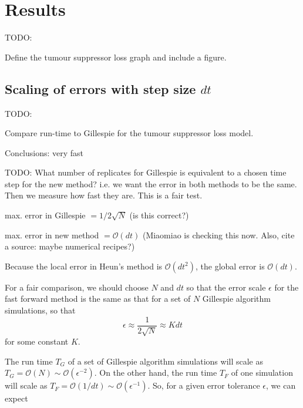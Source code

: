\documentclass{article}
\begin{document}
\section{Results}

TODO:

Define the tumour suppressor loss graph and include a figure.

\subsection{Scaling of errors with step size $dt$}

TODO:

Compare run-time to Gillespie for the tumour suppressor loss model.

  Conclusions: very fast

%

TODO: What number of replicates for Gillespie is equivalent to a chosen
time step for the new method? i.e. we want the error in both methods to be the
same. Then we measure how fast they are. This is a fair test.

max. error in Gillespie $= 1 / 2 \sqrt{N}$ (is this correct?)

max. error in new method $= \mathcal{O}(dt)$ (Miaomiao is checking this
now. Also, cite a source: maybe numerical recipes?)

Because the local error in Heun's method is $\mathcal{O}(dt^2)$, the global
error is $\mathcal{O}(dt)$.

For a fair comparison, we should choose $N$ and $dt$ so that the error scale
$\epsilon$ for the
fast forward method is the same as that for a set of $N$ Gillespie algorithm
simulations, so that
\begin{equation}
    \epsilon \approx \frac{1}{2\sqrt{N}} \approx K dt
\end{equation}
for some constant $K$.

The run time $T_G$ of a set of Gillespie algorithm simulations will scale as
$T_G = \mathcal{O}(N) \sim \mathcal{O}(\epsilon^{-2})$. On the other hand, the run time $T_F$ of one
simulation will scale as $T_F = \mathcal{O}(1/dt) \sim \mathcal{O}(\epsilon^{-1})$. So, for a given
error tolerance $\epsilon$, we can expect
\end{document}
